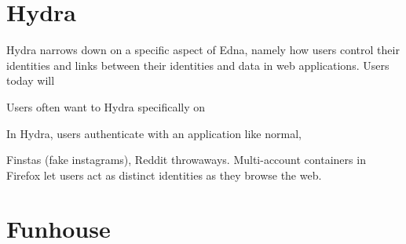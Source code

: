 \begin{comment}

Edna is complementary to existing data protection mechanisms. For example, we
combine Edna with an encrypted database to achieve stronger guarantees.
Ednacrypt simultaneously protects against database server compromises even for
unsealed data and adds Edna's protections for sealed data to encrypted
databases, which have no built-in support for removing sensitive data without
breaking the application.

To investigate the need for Edna as a new system, we tried to realize Edna's
functionality atop Qapla~\cite{qapla}, a framework that rewrites SQL queries to
conform to access control policies. We found that Qapla requires invasive
application changes, its abstractions are awkward for sealing and revealing, and
Qapla's query rewriting slows down common queries.


\end{comment}


\section{Hydra}

Hydra narrows down on a specific aspect of Edna, namely how users control their
identities and links between their identities and data in web applications.
Users today will 

Users often want to 
Hydra specifically on 

In Hydra, users authenticate with an application like normal,

Finstas (fake instagrams), Reddit throwaways. 
Multi-account containers in Firefox let users act as distinct identities as they
browse the web.


\section{Funhouse}
